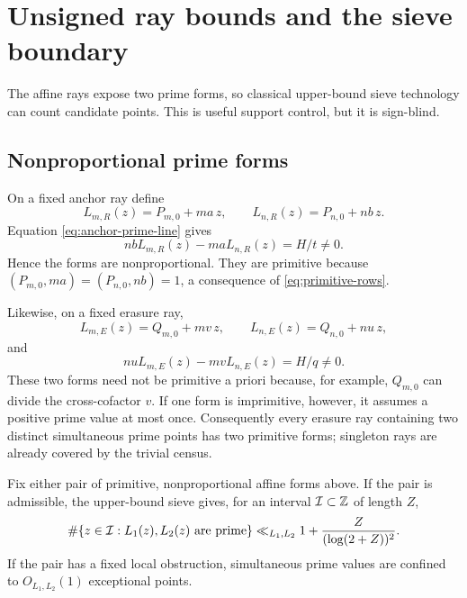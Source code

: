 \section{Unsigned ray bounds and the sieve boundary}
\label{sec:sieve-boundary}

The affine rays expose two prime forms, so classical upper-bound sieve
technology can count candidate points.  This is useful support control,
but it is sign-blind.

\subsection{Nonproportional prime forms}

On a fixed anchor ray define
\[
 L_{m,R}(z)=P_{m,0}+ma\,z,\qquad
 L_{n,R}(z)=P_{n,0}+nb\,z.
\]
Equation \eqref{eq:anchor-prime-line} gives
\begin{equation}
 nbL_{m,R}(z)-maL_{n,R}(z)=H/t\ne0.
 \label{eq:anchor-form-determinant}
\end{equation}
Hence the forms are nonproportional.  They are primitive because
\((P_{m,0},ma)=(P_{n,0},nb)=1\), a consequence of
\eqref{eq:primitive-rows}.

Likewise, on a fixed erasure ray,
\[
 L_{m,E}(z)=Q_{m,0}+mv\,z,\qquad
 L_{n,E}(z)=Q_{n,0}+nu\,z,
\]
and
\begin{equation}
 nuL_{m,E}(z)-mvL_{n,E}(z)=H/q\ne0.
 \label{eq:erasure-form-determinant}
\end{equation}
These two forms need not be primitive a priori because, for example,
\(Q_{m,0}\) can divide the cross-cofactor \(v\).  If one form is
imprimitive, however, it assumes a positive prime value at most once.
Consequently every erasure ray containing two distinct simultaneous prime
points has two primitive forms; singleton rays are already covered by the
trivial census.

\begin{proposition}
\label{prop:fixed-ray-sieve-boundary}
Fix either pair of primitive, nonproportional affine forms above.  If the
pair is admissible, the upper-bound sieve gives, for an interval
\(\mathcal I\subset\mathbb Z\) of length \(Z\),
\begin{equation}
 \#\{z\in\mathcal I:L_1(z),L_2(z)\text{ are prime}\}
 \ll_{L_1,L_2}
 1+\frac{Z}{(\log(2+Z))^2}.
 \label{eq:fixed-ray-sieve-bound}
\end{equation}
If the pair has a fixed local obstruction, simultaneous prime values are
confined to \(O_{L_1,L_2}(1)\) exceptional points.
\end{proposition}

